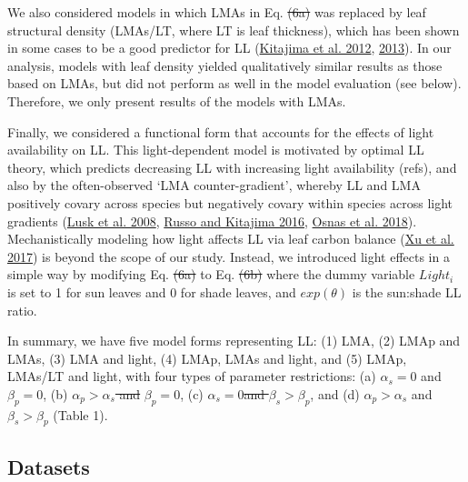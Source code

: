 \documentclass[
  12pt,
  a4paper,
,tablecaptionabove
]{scrartcl}
\providecommand{\DIFaddtex}[1]{{\protect\color{blue}\uwave{#1}}} %
\providecommand{\DIFdeltex}[1]{{\protect\color{red}\sout{#1}}}                      %
\providecommand{\DIFaddbegin}{} %
\providecommand{\DIFaddend}{} %
\providecommand{\DIFdelbegin}{} %
\providecommand{\DIFdelend}{} %
\providecommand{\DIFadd}[1]{\texorpdfstring{\DIFaddtex{#1}}{#1}} %
\providecommand{\DIFdel}[1]{\texorpdfstring{\DIFdeltex{#1}}{}} %
\newcommand{\DIFscaledelfig}{0.5}
\newlength{\DIFdelgraphicswidth} %
\newlength{\DIFdelgraphicsheight} %
\newcommand{\DIFaddincludegraphics}[2][]{{\color{blue}\fbox{\DIFOincludegraphics[#1]{#2}}}} %
\newcommand{\DIFdelincludegraphics}[2][]{%
\sbox{\DIFdelgraphicsbox}{\DIFOincludegraphics[#1]{#2}}%
\settoboxwidth{\DIFdelgraphicswidth}{\DIFdelgraphicsbox} %
\settoboxtotalheight{\DIFdelgraphicsheight}{\DIFdelgraphicsbox} %
\scalebox{\DIFscaledelfig}{%
\parbox[b]{\DIFdelgraphicswidth}{\usebox{\DIFdelgraphicsbox}\\[-\baselineskip] \rule{\DIFdelgraphicswidth}{0em}}\llap{\resizebox{\DIFdelgraphicswidth}{\DIFdelgraphicsheight}{%
\setlength{\unitlength}{\DIFdelgraphicswidth}%
\begin{picture}(1,1)%
\thicklines\linethickness{2pt} %
{\color[rgb]{1,0,0}\put(0,0){\framebox(1,1){}}}%
{\color[rgb]{1,0,0}\put(0,0){\line( 1,1){1}}}%
{\color[rgb]{1,0,0}\put(0,1){\line(1,-1){1}}}%
\end{picture}%
}\hspace*{3pt}}} %
} %
\DeclareRobustCommand{\DIFaddbegin}{\DIFOaddbegin \let\includegraphics\DIFaddincludegraphics} %
\DeclareRobustCommand{\DIFaddend}{\DIFOaddend \let\includegraphics\DIFOincludegraphics} %
\DeclareRobustCommand{\DIFdelbegin}{\DIFOdelbegin \let\includegraphics\DIFdelincludegraphics} %
\DeclareRobustCommand{\DIFdelend}{\DIFOaddend \let\includegraphics\DIFOincludegraphics} %
\begin{document}
We also considered models in which LMAs in Eq.
\DIFdelbegin \DIFdel{(6a) }\DIFdelend \DIFaddbegin \DIFadd{\ref{eq:LL_pot}-\ref{eq:LL_opt} }\DIFaddend was replaced by leaf structural density
(LMAs/LT, where LT is leaf thickness), which has been shown in some
cases to be a good predictor for LL
(\protect\hyperlink{ref-Kitajima2012}{Kitajima et al. 2012},
\protect\hyperlink{ref-Kitajima2013}{2013}). In our analysis, models
with leaf density yielded qualitatively similar results as those based
on LMAs, but did not perform as well in the model evaluation (see
below). Therefore, we only present results of the models with LMAs.

Finally, we considered a functional form that accounts for the effects
of light availability on LL. This light-dependent model is motivated by
optimal LL theory, which predicts decreasing LL with increasing light
availability (refs), and also by the often-observed `LMA
counter-gradient', whereby LL and LMA positively covary across species
but negatively covary within species across light gradients
(\protect\hyperlink{ref-Lusk2008}{Lusk et al. 2008},
\protect\hyperlink{ref-Russo2016}{Russo and Kitajima 2016},
\protect\hyperlink{ref-Osnas2018}{Osnas et al. 2018}). Mechanistically
modeling how light affects LL via leaf carbon balance
(\protect\hyperlink{ref-Xu2017}{Xu et al. 2017}) is beyond the scope of
our study. Instead, we introduced light effects in a simple way by
modifying Eq. \DIFdelbegin \DIFdel{(6a) }\DIFdelend \DIFaddbegin \DIFadd{\ref{eq:LL_pot} }\DIFaddend to Eq. \DIFdelbegin \DIFdel{(6b) }\DIFdelend \DIFaddbegin \DIFadd{\ref{eq:LL_opt} }\DIFaddend where the dummy
variable \(Light_i\) is set to 1 for sun leaves and 0 for shade leaves,
and \(exp(\theta)\) is the sun:shade LL ratio.

In summary, we have five model forms representing LL: (1) LMA, (2) LMAp
and LMAs, (3) LMA and light, (4) LMAp, LMAs and light, and (5) LMAp,
LMAs/LT and light, with four types of parameter restrictions: (a)
\(\alpha_s = 0\) and \(\beta_p = 0\), (b) \DIFdelbegin \DIFdel{\(\alpha_p > \alpha_s\) and }\DIFdelend \(\beta_p = 0\), (c)
\(\alpha_s = 0\)\DIFdelbegin \DIFdel{and \(\beta_s > \beta_p\)}\DIFdelend , and (d) \(\alpha_p > \alpha_s\) and
\(\beta_s > \beta_p\) (Table 1).

\hypertarget{datasets}{%
\subsection{Datasets}\label{datasets}}
\end{document}
